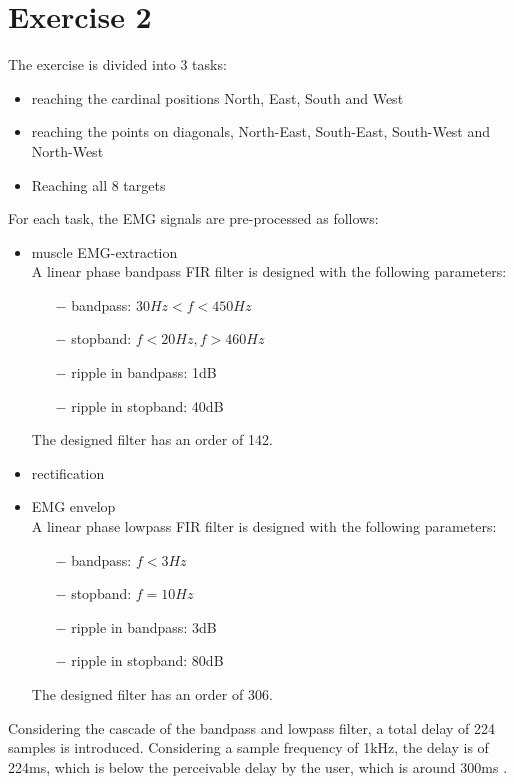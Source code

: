 \documentclass{article}
\begin{document}
	\section*{Exercise 2}
	The exercise is divided into 3 tasks:
	\begin{itemize}
		\item reaching the cardinal positions North, East, South and West
		\item reaching the points on diagonals, North-East, South-East, South-West and North-West
		\item Reaching all 8 targets
	\end{itemize}
	For each task, the EMG signals are pre-processed as follows:
	\begin{itemize}
		\item muscle EMG-extraction\\
			A linear phase bandpass FIR filter is designed with the following parameters:
		\begin{itemize}
			\item[$-$]bandpass: $30Hz < f < 450Hz$
			\item[$-$]stopband: $f < 20Hz, f > 460Hz$
			\item[$-$]ripple in bandpass: 1dB
			\item[$-$]ripple in stopband: 40dB
		\end{itemize}
		The designed filter has an order of 142.
		\item rectification
		\item EMG envelop\\
			A linear phase lowpass FIR filter is designed with the following parameters:
		\begin{itemize}
			\item[$-$]bandpass: $f < 3Hz$
			\item[$-$]stopband: $f = 10Hz$
			\item[$-$]ripple in bandpass: 3dB
			\item[$-$]ripple in stopband: 80dB
		\end{itemize}
		The designed filter has an order of 306.
	\end{itemize}
	Considering the cascade of the bandpass and lowpass filter, a total delay of 224 samples is introduced. Considering a sample frequency of 1kHz, the delay is of 224ms, which is below the perceivable delay by the user, which is around 300ms \cite{delaySensitivity}.
	
\end{document}
